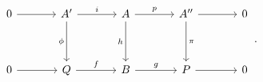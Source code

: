 \[
\begin{tikzcd}[column sep=3.5em, row sep=3.6em]
 0 \arrow[r]
 & A' \arrow[r,"i"] \arrow[d,"\phi"']
 & A \arrow[r,"p"] \arrow[d,"h"']
 & A'' \arrow[r] \arrow[d,"\pi"]
 & 0
 \\
 0 \arrow[r]
 & Q \arrow[r,"f"]
 & B \arrow[r,"g"]
 & P \arrow[r]
 & 0
\end{tikzcd}
\, .
\]
